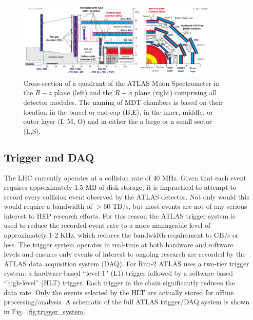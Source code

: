 \begin{figure}
	\centering
	\includegraphics[width=0.9\textwidth]{muon_spectrometer_quadrant}
	\caption{
	 Cross-section of a quadrant of the ATLAS Muon Spectrometer \cite{kuger2017signal} in the $R-z$ plane (left) and the $R-\phi$ plane (right) comprising all detector modules. The naming of MDT chambers is based on their location in the barrel or end-cap (B,E), in the inner, middle, or outer layer (I, M, O) and in either the a large or a small sector (L,S).
	}
\end{figure}

% 
\subsection{Trigger and DAQ}
The LHC currently operates at a collision rate of 40 MHz.
Given that each event requires approximately 1.5 MB of disk storage, it is impractical to attempt to record every collision event observed by the ATLAS detector.
Not only would this would require a bandwidth of $> 60$ TB/s, but most events are not of any serious interest to HEP research efforts.
For this reason the ATLAS trigger system \cite{Ruiz-Martinez:2133909} is used to reduce the recorded event rate to a more manageable level of approximately 1-2 KHz, which reduces the bandwidth requirement to GB/s or less.
The trigger system operates in real-time at both hardware and software levels and ensures only events of interest to ongoing research are recorded by the ATLAS data acquisition system (DAQ).
For Run-2 ATLAS uses a two-tier trigger system: a hardware-based ``level-1'' (L1) trigger followed by a software based ``high-level'' (HLT) trigger.
Each trigger in the chain significantly reduces the data rate.
Only the events selected by the HLT are actually stored for offline processing/analysis.
A schematic of the full ATLAS trigger/DAQ system is shown in Fig.~\ref{fig:trigger_system}.

